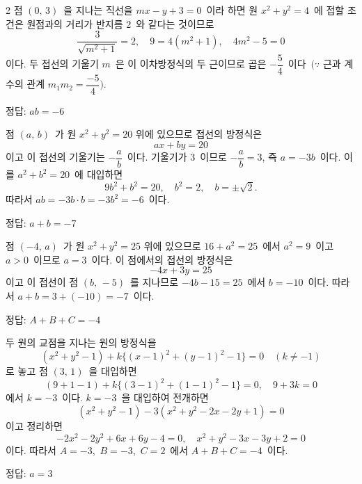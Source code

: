 \documentclass[10pt,fleqn]{article}
\begin{document}
\begin{multicols*}{2}
점 $(0,\, 3)$\ 을 지나는 직선을 $mx - y + 3 = 0$\ 이라 하면 원 $x^2 + y^2 = 4$\ 에 접할 조건은 원점과의 거리가 반지름 $2$\ 와 같다는 것이므로
\[ \dfrac{3}{\sqrt{m^2 + 1}} = 2,\quad 9 = 4(m^2 + 1),\quad 4m^2 - 5 = 0 \]
이다. 두 접선의 기울기 $m$\ 은 이 이차방정식의 두 근이므로 곱은 $-\dfrac{5}{4}$\ 이다\ $(\because$ 근과 계수의 관계 $m_1 m_2 = \dfrac{-5}{4})$.

\begin{dmanswerbox}
정답: $ab=-6$
\end{dmanswerbox}

점 $(a,\, b)$\ 가 원 $x^2 + y^2 = 20$ 위에 있으므로 접선의 방정식은
\[ ax + by = 20 \]
이고 이 접선의 기울기는 $-\dfrac{a}{b}$\ 이다. 기울기가 $3$\ 이므로 $-\dfrac{a}{b} = 3$, 즉 $a = -3b$\ 이다. 이를 $a^2 + b^2 = 20$\ 에 대입하면
\[ 9b^2 + b^2 = 20,\quad b^2 = 2,\quad b = \pm \sqrt{2}. \]
따라서 $ab = -3b \cdot b = -3b^2 = -6$\ 이다.

\begin{dmanswerbox}
정답: $a+b=-7$
\end{dmanswerbox}

점 $(-4,\, a)$\ 가 원 $x^2 + y^2 = 25$ 위에 있으므로 $16 + a^2 = 25$\ 에서 $a^2 = 9$\ 이고 $a > 0$\ 이므로 $a = 3$\ 이다. 이 점에서의 접선의 방정식은
\[ -4x + 3y = 25 \]
이고 이 접선이 점 $(b,\, -5)$\ 를 지나므로 $-4b - 15 = 25$\ 에서 $b = -10$\ 이다. 따라서 $a + b = 3 + (-10) = -7$\ 이다.

\begin{dmanswerbox}
정답: $A+B+C=-4$
\end{dmanswerbox}

두 원의 교점을 지나는 원의 방정식을
\[ (x^2 + y^2 - 1) + k\{(x-1)^2 + (y-1)^2 - 1\} = 0 \quad (k \ne -1) \]
로 놓고 점 $(3,\, 1)$\ 을 대입하면
\[ (9 + 1 - 1) + k\{(3-1)^2 + (1-1)^2 - 1\} = 0,\quad 9 + 3k = 0 \]
에서 $k = -3$\ 이다. $k = -3$\ 을 대입하여 전개하면
\[ (x^2 + y^2 - 1) - 3(x^2 + y^2 - 2x - 2y + 1) = 0 \]
이고 정리하면
\[ -2x^2 - 2y^2 + 6x + 6y - 4 = 0,\quad x^2 + y^2 - 3x - 3y + 2 = 0 \]
이다. 따라서 $A = -3$,\ $B = -3$,\ $C = 2$\ 에서 $A + B + C = -4$\ 이다.

\begin{dmanswerbox}
정답: $a=3$
\end{dmanswerbox}


\end{multicols*}
\end{document}

